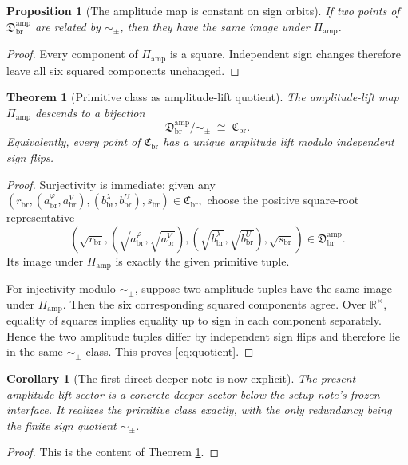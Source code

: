 \documentclass[11pt]{article}
\newcommand{\ScaleMod}{s_{\mathrm{br}}}
\newcommand{\PrimClass}{\mathfrak C_{\mathrm{br}}}
\newcommand{\PrimRead}{r_{\mathrm{br}}}
\newcommand{\PrimCovSlot}{a_{\mathrm{br}}^{\varphi}}
\newcommand{\PrimRelaxSlot}{a_{\mathrm{br}}^{V}}
\newcommand{\PrimWellSlot}{b_{\mathrm{br}}^{\lambda}}
\newcommand{\PrimEqSlot}{b_{\mathrm{br}}^{U}}
\newcommand{\DeepSector}{\mathfrak D_{\mathrm{br}}^{\mathrm{amp}}}
\newcommand{\AmpMap}{\Pi_{\mathrm{amp}}}
\newcommand{\SignQuot}{\sim_{\pm}}
\newcommand{\Rstar}{\mathbb R^{\times}}
\newtheorem{proposition}{Proposition}
\newtheorem{corollary}{Corollary}
\newtheorem{theorem}{Theorem}
\begin{document}
\begin{proposition}[The amplitude map is constant on sign orbits]
\label{prop:constant}
If two points of \(\DeepSector\) are related by \(\SignQuot\), then they have the same image under \(\AmpMap\).
\end{proposition}

\begin{proof}
Every component of \(\AmpMap\) is a square. Independent sign changes therefore leave all six squared components unchanged.
\end{proof}

\begin{theorem}[Primitive class as amplitude-lift quotient]
\label{thm:quotient}
The amplitude-lift map \(\AmpMap\) descends to a bijection
\begin{equation}
\DeepSector/\SignQuot \;\cong\; \PrimClass.
\label{eq:quotient}
\end{equation}
Equivalently, every point of \(\PrimClass\) has a unique amplitude lift modulo independent sign flips.
\end{theorem}

\begin{proof}
Surjectivity is immediate: given any
\(
(\PrimRead,(\PrimCovSlot,\PrimRelaxSlot),(\PrimWellSlot,\PrimEqSlot),\ScaleMod)\in\PrimClass,
\)
choose the positive square-root representative
\[
(\sqrt{\PrimRead},(\sqrt{\PrimCovSlot},\sqrt{\PrimRelaxSlot}),(\sqrt{\PrimWellSlot},\sqrt{\PrimEqSlot}),\sqrt{\ScaleMod})
\in\DeepSector.
\]
Its image under \(\AmpMap\) is exactly the given primitive tuple.

For injectivity modulo \(\SignQuot\), suppose two amplitude tuples have the same image under \(\AmpMap\). Then the six corresponding squared components agree. Over \(\Rstar\), equality of squares implies equality up to sign in each component separately. Hence the two amplitude tuples differ by independent sign flips and therefore lie in the same \(\SignQuot\)-class. This proves \eqref{eq:quotient}.
\end{proof}

\begin{corollary}[The first direct deeper note is now explicit]
\label{cor:explicit}
The present amplitude-lift sector is a concrete deeper sector below the setup note's frozen interface. It realizes the primitive class exactly, with the only redundancy being the finite sign quotient \(\SignQuot\).
\end{corollary}

\begin{proof}
This is the content of Theorem \ref{thm:quotient}.
\end{proof}
\end{document}
